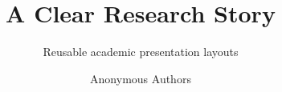 \newif\ifChineseSlides
\ChineseSlidesfalse %
\newcommand{\LatinFontPackage}{FiraSans} %
\newcommand{\CJKFontSet}{fandol} %


\title[Research Talk]{A Clear Research Story}
\subtitle{Reusable academic presentation layouts}
\author{Anonymous Authors}
\newcommand{\Presenter}{Anonymous Presenter}
\institute{} %
\newcommand{\HeaderInstitution}{} %
\newcommand{\Contact}{} %
\newcommand{\TalkType}{Research Presentation}
\date{}
